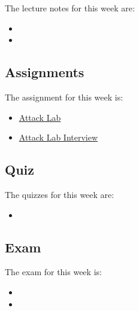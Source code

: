 \noindent The lecture notes for this week are:

\begin{itemize}
    \item {}
    \item {}
\end{itemize}

\subsection{Assignments}

The assignment for this week is:

\begin{itemize}
    \item \href{https://github.com/QuantumCompiler/CU/tree/main/CSPB%202400%20-%20Computer%20Systems/Assignments/Assignment%203%20-%20Attack%20Lab}{Attack Lab}
    \item \href{https://github.com/QuantumCompiler/CU/tree/main/CSPB%202400%20-%20Computer%20Systems/Assignments/Assignment%203%20-%20Attack%20Lab}{Attack Lab Interview}
\end{itemize}

\subsection{Quiz}

The quizzes for this week are:

\begin{itemize}
    \item {}
\end{itemize}

\subsection{Exam}

The exam for this week is:

\begin{itemize}
    \item {}
    \item {}
\end{itemize}

